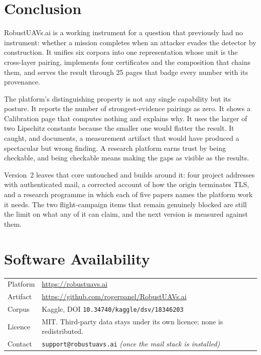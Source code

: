 \documentclass[11pt,a4paper]{article}
\newcommand{\code}[1]{\texttt{#1}}
\begin{document}
\section{Conclusion}

RobustUAVs.ai is a working instrument for a question that previously had no
instrument: whether a mission completes when an attacker evades the detector by
construction. It unifies six corpora into one representation whose unit is the
cross-layer pairing, implements four certificates and the composition that
chains them, and serves the result through 25 pages that badge every number with
its provenance.

The platform's distinguishing property is not any single capability but its
posture. It reports the number of strongest-evidence pairings as zero. It shows
a Calibration page that computes nothing and explains why. It uses the larger of
two Lipschitz constants because the smaller one would flatter the result. It
caught, and documents, a measurement artifact that would have produced a
spectacular but wrong finding. A research platform earns trust by being
checkable, and being checkable means making the gaps as visible as the results.

Version~2 leaves that core untouched and builds around it: four project
addresses with authenticated mail, a corrected account of how the origin
terminates TLS, and a research programme in which each of five papers names the
platform work it needs. The two flight-campaign items that remain genuinely
blocked are still the limit on what any of it can claim, and the next version is
measured against them.

\section*{Software Availability}

\begin{table}[H]
\centering\small
\begin{tabularx}{\linewidth}{@{}p{3.0cm}X@{}}
\toprule
Platform & \url{https://robustuavs.ai} \\
Artifact & \url{https://github.com/rogerpanel/RobustUAVs.ai} \\
Corpus & Kaggle, DOI \code{10.34740/kaggle/dsv/18346203} \\
Licence & MIT. Third-party data stays under its own licence; none is redistributed. \\
Contact & \code{support@robustuavs.ai} \emph{(once the mail stack is installed)} \\
\bottomrule
\end{tabularx}
\end{table}
\end{document}
